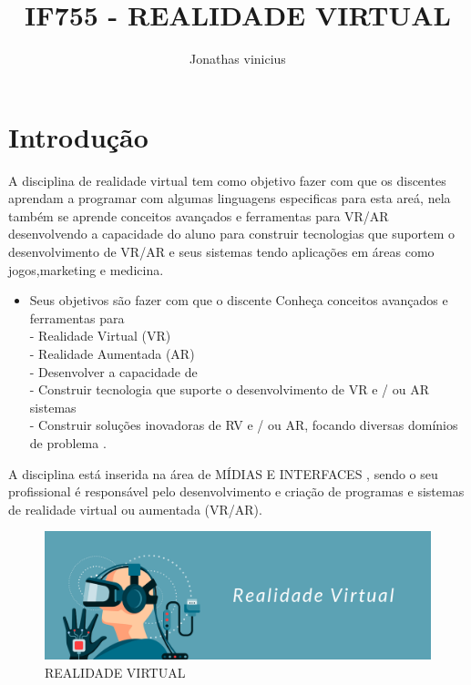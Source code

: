 \documentclass[10pt]{article}
\title{IF755 - REALIDADE VIRTUAL}
\author{Jonathas vinicius }
\date{\vspace{-5ex}}
\begin{document}
\maketitle

\section{Introdução}

A disciplina de realidade virtual tem como objetivo fazer com que os discentes aprendam a programar com algumas linguagens especificas para esta areá, nela também se aprende conceitos avançados e ferramentas para VR/AR desenvolvendo a capacidade do aluno para construir tecnologias que suportem o desenvolvimento de VR/AR e seus sistemas tendo aplicações em áreas como jogos,marketing e medicina.

\begin{itemize}
  \item Seus objetivos são fazer com que o discente Conheça conceitos avançados e ferramentas para
\\- Realidade Virtual (VR)
\\ - Realidade Aumentada (AR)
\\ - Desenvolver a capacidade de
\\- Construir tecnologia que suporte o desenvolvimento de VR e / ou AR
sistemas
\\ - Construir soluções inovadoras de RV e / ou AR, focando diversas
domínios de problema .\cite{primeira}
\end{itemize}

A disciplina está inserida na área de MÍDIAS E INTERFACES , sendo o seu profissional é responsável pelo desenvolvimento e criação de programas e sistemas de realidade virtual ou aumentada (VR/AR).

\begin{figure}[]
    \centering
    \includegraphics[scale=0.15]{realidadevirtual.png}
    \caption{REALIDADE VIRTUAL \cite{quinta}}
    \label{fig:realidadevirtual}
\end{figure}
\end{document}
